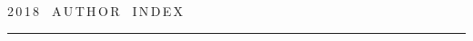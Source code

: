  \label{end\stat}





\newpage












\def\stat{cont-e}


{%




\raggedleft\Large \bf%


2\,0\,1\,8\ \ A\,U\,T\,H\,O\,R\ \ I\,N\,D\,E\,X \vskip 17pt


 \hrule


 \par


 }





\label{st\stat}





\def\tit{\ }





\def\aut{\ }


\def\auf{\ }





\def\leftkol{\ } %





\def\rightkol{\ } %





\titele{\tit}{\aut}{\auf}{\leftkol}{\rightkol}







\def\leftfootline{\small{\textbf{\thepage}


\hfill INFORMATIKA I EE PRIMENENIYA~--- INFORMATICS AND APPLICATIONS\ \ \ 2018\


\ \ volume~12\ \ \ issue\ 4}


}%


